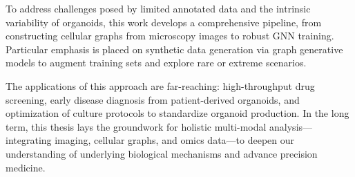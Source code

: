 To address challenges posed by limited annotated data and the intrinsic variability of organoids, this work develops a comprehensive pipeline, from constructing cellular graphs from microscopy images to robust GNN training. Particular emphasis is placed on synthetic data generation via graph generative models to augment training sets and explore rare or extreme scenarios.

The applications of this approach are far-reaching: high-throughput drug screening, early disease diagnosis from patient-derived organoids, and optimization of culture protocols to standardize organoid production. In the long term, this thesis lays the groundwork for holistic multi-modal analysis—integrating imaging, cellular graphs, and omics data—to deepen our understanding of underlying biological mechanisms and advance precision medicine.

\vspace{0.5cm}
